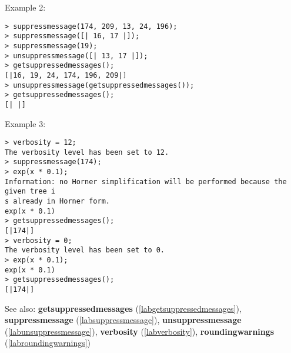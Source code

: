 \noindent Example 2: 
\begin{center}\begin{minipage}{15cm}\begin{Verbatim}[frame=single]
> suppressmessage(174, 209, 13, 24, 196);
> suppressmessage([| 16, 17 |]);
> suppressmessage(19);
> unsuppressmessage([| 13, 17 |]);
> getsuppressedmessages();
[|16, 19, 24, 174, 196, 209|]
> unsuppressmessage(getsuppressedmessages());
> getsuppressedmessages();
[| |]
\end{Verbatim}
\end{minipage}\end{center}
\noindent Example 3: 
\begin{center}\begin{minipage}{15cm}\begin{Verbatim}[frame=single]
> verbosity = 12;
The verbosity level has been set to 12.
> suppressmessage(174);
> exp(x * 0.1);
Information: no Horner simplification will be performed because the given tree i
s already in Horner form.
exp(x * 0.1)
> getsuppressedmessages();
[|174|]
> verbosity = 0;
The verbosity level has been set to 0.
> exp(x * 0.1);
exp(x * 0.1)
> getsuppressedmessages();
[|174|]
\end{Verbatim}
\end{minipage}\end{center}
See also: \textbf{getsuppressedmessages} (\ref{labgetsuppressedmessages}), \textbf{suppressmessage} (\ref{labsuppressmessage}), \textbf{unsuppressmessage} (\ref{labunsuppressmessage}), \textbf{verbosity} (\ref{labverbosity}), \textbf{roundingwarnings} (\ref{labroundingwarnings})
